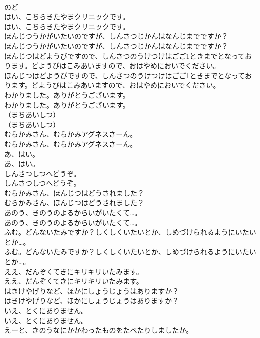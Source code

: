 \documentclass[8pt]{extreport}
\begin{document}
\begin{CJK}{UTF8}{min}
\\	のど
\\	はい、こちらきたやまクリニックです。
\\	はい、こちらきたやまクリニックです。
\\	ほんじつうかがいたいのですが、しんさつじかんはなんじまでですか？
\\	ほんじつうかがいたいのですが、しんさつじかんはなんじまでですか？
\\	ほんじつはどようびですので、しんさつのうけつけはごご1ときまでとなっております。どようびはこみあいますので、おはやめにおいでください。
\\	ほんじつはどようびですので、しんさつのうけつけはごご1ときまでとなっております。どようびはこみあいますので、おはやめにおいでください。
\\	わかりました。ありがとうございます。
\\	わかりました。ありがとうございます。
\\	（まちあいしつ）
\\	（まちあいしつ）
\\	むらかみさん、むらかみアグネスさーん。
\\	むらかみさん、むらかみアグネスさーん。
\\	あ、はい。
\\	あ、はい。
\\	しんさつしつへどうぞ。
\\	しんさつしつへどうぞ。
\\	むらかみさん、ほんじつはどうされました？
\\	むらかみさん、ほんじつはどうされました？
\\	あのう、きのうのよるからいがいたくて…。
\\	あのう、きのうのよるからいがいたくて…。
\\	ふむ。どんないたみですか？しくしくいたいとか、しめづけられるようにいたいとか…。
\\	ふむ。どんないたみですか？しくしくいたいとか、しめづけられるようにいたいとか…。
\\	ええ、だんぞくてきにキリキリいたみます。
\\	ええ、だんぞくてきにキリキリいたみます。
\\	はきけやげりなど、ほかにしょうじょうはありますか？
\\	はきけやげりなど、ほかにしょうじょうはありますか？
\\	いえ、とくにありません。
\\	いえ、とくにありません。
\\	えーと、きのうなにかかわったものをたべたりしましたか。

\end{CJK}
\end{document}
